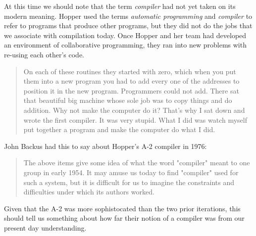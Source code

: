 At this time we should note that the term \textit{compiler} had not yet taken on its modern meaning.
Hopper used the terms \textit{automatic programming} and \textit{compiler} to refer to programs
that produce other programs, but they did not do the jobs that we associate with compilation today.
Once Hopper and her team had developed an environment of collaborative programming, they
ran into new problems with re-using each other's code.

\begin{quotation}
On each of these routines they started with zero, which when you put them into 
a new program you had to add every one of the addresses to position it in the 
new program. Programmers could not add.  There sat that beautiful big machine 
whose sole job was to copy things and do addition. Why not make the computer do 
it? That's why I sat down and wrote the first compiler. It was very stupid. 
What I did was watch myself put together a program and make the computer do 
what I did. 
\cite{Hopper_1980_Oral_History}
\end{quotation}

John Backus had this to say about Hopper's A-2 compiler in 1976:
\begin{quotation}
The above items give some idea of what the word "compiler" meant to one
group in early 1954. It may amuse us today to find "compiler" used for such
a system, but it is difficult for us to imagine the constraints and difficulties
under which its authors worked.
\cite{Backus_1980_Programming_in_America_in_1950s}
\end{quotation}

Given that the A-2 was more sophistocated than the two prior iterations,
this should tell us something about how far their notion of a compiler was
from our present day understanding.




